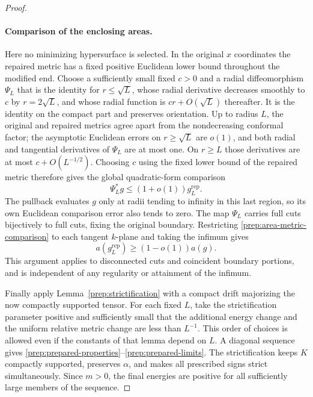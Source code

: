 \begin{proof}
\paragraph{Comparison of the enclosing areas.}
Here no minimizing hypersurface is selected.  In the original $x$
coordinates the repaired metric has a fixed positive Euclidean lower
bound throughout the modified end.  Choose a sufficiently small fixed
$c>0$ and a radial diffeomorphism $\Psi_L$ that is the identity for
$r\leq\sqrt L$, whose radial derivative decreases smoothly to $c$
by $r=2\sqrt L$, and whose radial function is $cr+O(\sqrt L)$
thereafter.  It is the identity on the compact part and preserves
orientation.  Up to radius $L$, the original and repaired metrics agree
apart from the nondecreasing conformal factor; the asymptotic
Euclidean errors on $r\geq\sqrt L$ are $o(1)$, and both radial and
tangential derivatives of $\Psi_L$ are at most one.  On $r\geq L$
those derivatives are at most $c+O(L^{-1/2})$.  Choosing $c$ using the
fixed lower bound of the repaired metric therefore gives the global
quadratic-form comparison
\begin{equation}
 \label{prep:area-metric-comparison}
 \Psi_L^*g\leq(1+o(1))g_L^{\mathrm{rep}}.
\end{equation}
The pullback evaluates $g$ only at radii tending to infinity in this
last region, so its own Euclidean comparison error also tends to zero.
The map $\Psi_L$ carries full cuts bijectively to full cuts, fixing the
original boundary.  Restricting
\eqref{prep:area-metric-comparison} to each tangent $k$-plane and taking
the infimum gives
\[
 a(g_L^{\mathrm{rep}})\geq(1-o(1))a(g).
\]
This argument applies to disconnected cuts and coincident boundary
portions, and is independent of any regularity or attainment of the
infimum.

Finally apply Lemma~\ref{prep:strictification} with a compact drift
majorizing the now compactly supported tensor.  For each fixed $L$,
take the strictification parameter positive and sufficiently small
that the additional energy change and the uniform relative metric
change are less than $L^{-1}$.  This order of choices is allowed even
if the constants of that lemma depend on $L$.  A diagonal sequence
gives \eqref{prep:prepared-properties}--\eqref{prep:prepared-limits}.
The strictification keeps $K$ compactly supported, preserves $\alpha$,
and makes all prescribed signs strict simultaneously.  Since $m>0$,
the final energies are positive for all sufficiently large members of
the sequence.
\end{proof}

